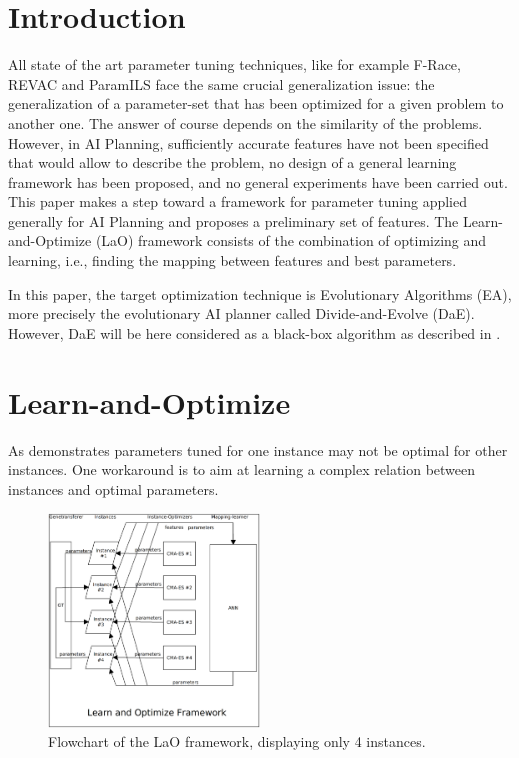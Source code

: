 \documentclass{sig-alt-release2}
\begin{document}



\section{Introduction}

All state of the art parameter tuning techniques, like for example F-Race, REVAC and ParamILS \cite{Montero:2010} face the same crucial generalization issue: the generalization of a parameter-set that has been optimized for a given problem to another one. The answer of course depends on the similarity of the problems. However, in AI Planning, sufficiently accurate features have not been specified that would allow to describe the problem, no design of a general learning framework has been proposed, and no general experiments have been carried out. This paper makes a step toward a framework for parameter tuning applied generally for AI Planning and proposes a preliminary set of features. The Learn-and-Optimize (LaO) framework consists of the combination of optimizing and learning, i.e., finding the mapping between features and best parameters.

In this paper, the target optimization technique is Evolutionary Algorithms (EA), more precisely the evolutionary AI planner called Divide-and-Evolve (DaE). However, DaE will be here considered as a black-box algorithm as described in \cite{BibEvoCop:2010}. 

\section{Learn-and-Optimize}
\label{section:LaO}

As \cite{BibGECCO:2010} demonstrates parameters tuned for one instance may not be optimal for other instances. One workaround is to aim at learning a complex relation between instances and optimal parameters.

\begin{figure}[h!]
  \centering
     \includegraphics[width=0.5\textwidth]{lao.eps}

  \caption{Flowchart of the LaO framework, displaying only 4 instances.}
\label{figure:laoflowchart}
\end{figure}
\end{document}
